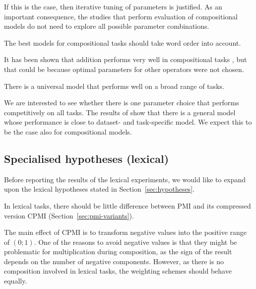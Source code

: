 If this is the case, then iterative tuning of parameters is justified. As an important consequence, the studies that perform evaluation of compositional models do not need to explore all possible parameter combinations.

\begin{hyp}
\label{hyp:order}
The best models for compositional tasks should take word order into account.
\end{hyp}

It has been shown that addition performs very well in compositional tasks \cite{milajevs-EtAl:2014:EMNLP2014}, but that could be because optimal parameters for other operators were not chosen.

\begin{hyp}
\label{hyp:universal}
There is a universal model that performs well on a broad range of tasks.
\end{hyp}

We are interested to see whether there is one parameter choice that performs competitively on all tasks. The results of \citet{lapesa2014large} show that there is a general model whose performance is close to dataset- and task-specific model. We expect this to be the case also for compositional models.

\subsection{Specialised hypotheses (lexical)}
\label{sec:elab-hypoth-lexical}

Before reporting the results of the lexical experiments, we would like to expand upon the lexical hypotheses stated in Section~\ref{sec:hypotheses}.

\begin{hyp}
  \label{hyp:lex-pmi-cpmi}
  In lexical tasks, there should be little difference between PMI and its compressed version CPMI (Section~\ref{sec:pmi-variants}).
\end{hyp}

The main effect of CPMI is to transform negative values into the positive range of $(0; 1)$. One of the reasons to avoid negative values is that they might be problematic for multiplication during composition, as the sign of the result depends on the number of negative components. However, as there is no composition involved in lexical tasks, the weighting schemes should behave equally.

